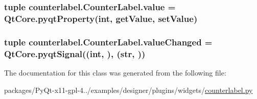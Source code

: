 \subsubsection[{value}]{\setlength{\rightskip}{0pt plus 5cm}tuple counterlabel.\+Counter\+Label.\+value = Qt\+Core.\+pyqt\+Property(int, {\bf get\+Value}, {\bf set\+Value})\hspace{0.3cm}{\ttfamily [static]}}\label{classcounterlabel_1_1CounterLabel_ad01646565864a58c8217eb5637ec625f}
\hypertarget{classcounterlabel_1_1CounterLabel_a0e02a9f200c7d6256be3602423e3993c}{}
\subsubsection[{value\+Changed}]{\setlength{\rightskip}{0pt plus 5cm}tuple counterlabel.\+Counter\+Label.\+value\+Changed = Qt\+Core.\+pyqt\+Signal((int, ), (str, ))\hspace{0.3cm}{\ttfamily [static]}}\label{classcounterlabel_1_1CounterLabel_a0e02a9f200c7d6256be3602423e3993c}


The documentation for this class was generated from the following file\+:\begin{DoxyCompactItemize}
\item 
packages/\+Py\+Qt-\/x11-\/gpl-\/4../examples/designer/plugins/widgets/\hyperlink{counterlabel_8py}{counterlabel.\+py}\end{DoxyCompactItemize}
